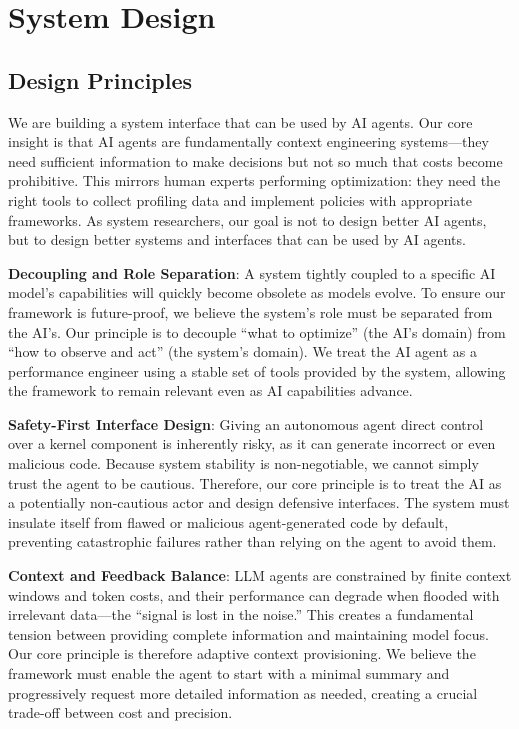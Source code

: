 \section{System Design}
\label{sec:design}

\subsection{Design Principles}

We are building a system interface that can be used by AI agents. Our core insight is that AI agents are fundamentally context engineering systems—they need sufficient information to make decisions but not so much that costs become prohibitive. This mirrors human experts performing optimization: they need the right tools to collect profiling data and implement policies with appropriate frameworks. As system researchers, our goal is not to design better AI agents, but to design better systems and interfaces that can be used by AI agents.

\textbf{Decoupling and Role Separation}: A system tightly coupled to a specific AI model's capabilities will quickly become obsolete as models evolve. To ensure our framework is future-proof, we believe the system's role must be separated from the AI's. Our principle is to decouple ``what to optimize'' (the AI's domain) from ``how to observe and act'' (the system's domain). We treat the AI agent as a performance engineer using a stable set of tools provided by the system, allowing the framework to remain relevant even as AI capabilities advance.

\textbf{Safety-First Interface Design}: Giving an autonomous agent direct control over a kernel component is inherently risky, as it can generate incorrect or even malicious code. Because system stability is non-negotiable, we cannot simply trust the agent to be cautious. Therefore, our core principle is to treat the AI as a potentially non-cautious actor and design defensive interfaces. The system must insulate itself from flawed or malicious agent-generated code by default, preventing catastrophic failures rather than relying on the agent to avoid them.

\textbf{Context and Feedback Balance}: LLM agents are constrained by finite context windows and token costs, and their performance can degrade when flooded with irrelevant data—the ``signal is lost in the noise.'' This creates a fundamental tension between providing complete information and maintaining model focus. Our core principle is therefore adaptive context provisioning. We believe the framework must enable the agent to start with a minimal summary and progressively request more detailed information as needed, creating a crucial trade-off between cost and precision.

